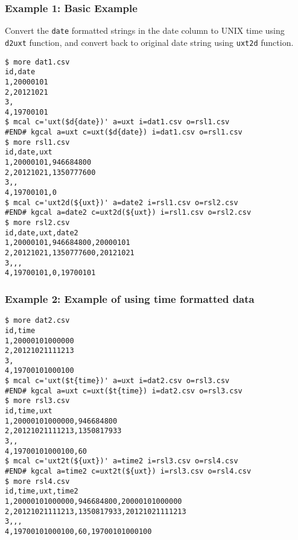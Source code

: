 \subsubsection*{Example 1: Basic Example}

Convert the \verb|date| formatted strings in the date column to UNIX time using \verb|d2uxt| function, and convert back to original date string using \verb|uxt2d| function.


\begin{Verbatim}[baselinestretch=0.7,frame=single]
$ more dat1.csv
id,date
1,20000101
2,20121021
3,
4,19700101
$ mcal c='uxt($d{date})' a=uxt i=dat1.csv o=rsl1.csv
#END# kgcal a=uxt c=uxt($d{date}) i=dat1.csv o=rsl1.csv
$ more rsl1.csv
id,date,uxt
1,20000101,946684800
2,20121021,1350777600
3,,
4,19700101,0
$ mcal c='uxt2d(${uxt})' a=date2 i=rsl1.csv o=rsl2.csv
#END# kgcal a=date2 c=uxt2d(${uxt}) i=rsl1.csv o=rsl2.csv
$ more rsl2.csv
id,date,uxt,date2
1,20000101,946684800,20000101
2,20121021,1350777600,20121021
3,,,
4,19700101,0,19700101
\end{Verbatim}
\subsubsection*{Example 2: Example of using time formatted data}



\begin{Verbatim}[baselinestretch=0.7,frame=single]
$ more dat2.csv
id,time
1,20000101000000
2,20121021111213
3,
4,19700101000100
$ mcal c='uxt($t{time})' a=uxt i=dat2.csv o=rsl3.csv
#END# kgcal a=uxt c=uxt($t{time}) i=dat2.csv o=rsl3.csv
$ more rsl3.csv
id,time,uxt
1,20000101000000,946684800
2,20121021111213,1350817933
3,,
4,19700101000100,60
$ mcal c='uxt2t(${uxt})' a=time2 i=rsl3.csv o=rsl4.csv
#END# kgcal a=time2 c=uxt2t(${uxt}) i=rsl3.csv o=rsl4.csv
$ more rsl4.csv
id,time,uxt,time2
1,20000101000000,946684800,20000101000000
2,20121021111213,1350817933,20121021111213
3,,,
4,19700101000100,60,19700101000100
\end{Verbatim}
